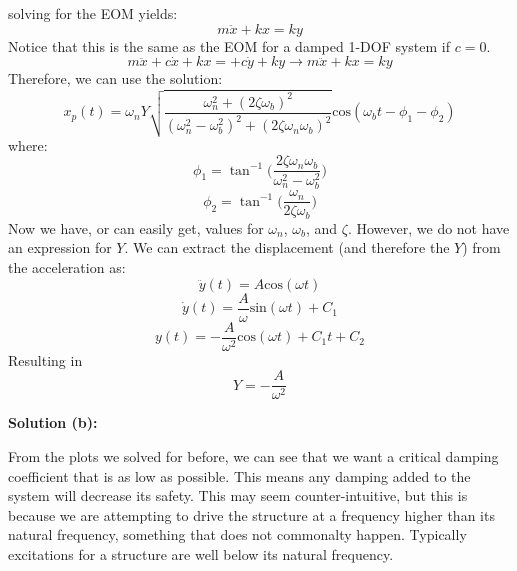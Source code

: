 \documentclass[12pt,letter]{article}
\begin{document}
\begin{example}
			solving for the EOM yields:
			\begin{equation}
				m\ddot{x} + kx = ky
			\end{equation} 				
			Notice that this is the same as the EOM for a damped 1-DOF system if $c=0$.	
			\begin{equation}
			m\ddot{x} + c\dot{x} + kx = + c\dot{y} + ky \rightarrow m\ddot{x} + kx = ky
			\end{equation}
			Therefore, we can use the solution:
			\begin{equation}
				x_p(t) = 	\omega_n Y   \sqrt{\frac{\omega_n^2 + (2 \zeta \omega_b)^2 }{(\omega_n^2 - \omega_b^2)^2 +  (2\zeta \omega_n \omega_b)^2} }  \text{cos}(\omega_bt - \phi_1 - \phi_2)
			\end{equation}
			where:
			\begin{equation}
				\phi_1 = \tan^{-1} \bigg(\frac{2\zeta \omega_n \omega_b}{\omega_n^2 - \omega_b^2}\bigg)
			\end{equation}	
			\begin{equation}
				\phi_2 = \tan^{-1} \bigg(\frac{\omega_n}{2\zeta \omega_b}\bigg)
			\end{equation}
			Now we have, or can easily get, values for $\omega_n$, $\omega_b$, and $\zeta$. However, we do not have an expression for $Y$. We can extract the displacement (and therefore the $Y$) from the acceleration as:
			\begin{equation}
				\ddot{y}(t) = A \text{cos}(\omega t)
			\end{equation} 				
			\begin{equation}
				\dot{y}(t) = \frac{A}{\omega} \text{sin}(\omega t) + C_1
			\end{equation} 					
			\begin{equation}
				y(t) = - \frac{A}{\omega^2} \text{cos}(\omega t) + C_1t + C_2
			\end{equation} 					
			Resulting in 
			\begin{equation}
				Y = -\frac{A}{\omega^2}
			\end{equation} 			
			
			\noindent\textbf{Solution (b):}
			
			\noindent From the plots we solved for before, we can see that we want a critical damping coefficient that is as low as possible. This means any damping added to the system will decrease its safety. This may seem counter-intuitive, but this is because we are attempting to drive the structure at a frequency higher than its natural frequency, something that does not commonalty happen. Typically excitations for a structure are well below its natural frequency.  			
		
		\end{example}			
\end{document}
